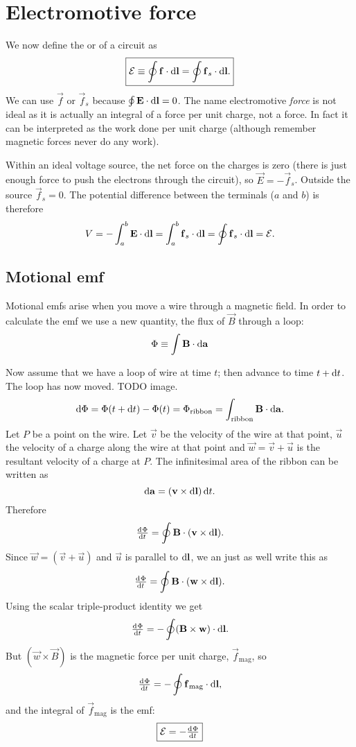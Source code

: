 \section{Electromotive force}
We now define the  or  of a circuit as
\[ \boxed{ \mathcal{E} \equiv \oint \bm{\mathrm{f}}\cdot \operatorname{d \!}{\bm{\mathrm{l}}} = \oint \bm{\mathrm{f}}_s\cdot \operatorname{d \!}{\bm{\mathrm{l}}}.} \]
We can use $\vec{f}$ or $\vec{f}_s$ because $\oint \bm{\mathrm{E}}\cdot \operatorname{d \!}{\bm{\mathrm{l}}} = 0$. The name electromotive \textit{force} is not ideal as it is actually an integral of a force per unit charge, not a force. In fact it can be interpreted as the work done per unit charge (although remember magnetic forces never do any work).

Within an ideal voltage source, the net force on the charges is zero (there is just enough force to push the electrons through the circuit), so $\vec{E} = - \vec{f}_s$. Outside the source $\vec{f}_s = 0$. The potential difference between the terminals ($a$ and $b$) is therefore
\[ V = -\int_a^b \bm{\mathrm{E}}\cdot \operatorname{d \!}{\bm{\mathrm{l}}} = \int^b_a \bm{\mathrm{f}}_s\cdot \operatorname{d \!}{\bm{\mathrm{l}}} = \oint \bm{\mathrm{f}}_s \cdot \operatorname{d \!}{\bm{\mathrm{l}}} = \mathcal{E}. \]

\subsection{Motional emf}
Motional emfs arise when you move a wire through a magnetic field. In order to calculate the emf we use a new quantity, the flux of $\vec{B}$ through a loop:
\[ \Phi \equiv \int \bm{\mathrm{B}}\cdot \operatorname{d \!}{\bm{\mathrm{a}}} \]

Now assume that we have a loop of wire at time $t$; then advance to time $t+\operatorname{d \!}{t}$. The loop has now moved. TODO image.
\[ \operatorname{d \!}{\Phi} = \Phi(t+\operatorname{d \!}{t}) - \Phi(t) = \Phi_\text{ribbon} = \int_\text{ribbon} \bm{\mathrm{B}}\cdot \operatorname{d \!}{\bm{\mathrm{a}}}. \]
Let $P$ be a point on the wire. Let $\vec{v}$ be the velocity of the wire at that point, $\vec{u}$ the velocity of a charge along the wire at that point and $\vec{w} = \vec{v} + \vec{u}$ is the resultant velocity of a charge at $P$. The infinitesimal area of the ribbon can be written as
\[ \operatorname{d \!}{\bm{\mathrm{a}}} = (\bm{\mathrm{v}}\times \operatorname{d \!}{\bm{\mathrm{l}}})\operatorname{d \!}{t}. \]
Therefore
\[ \od{\Phi}{t} = \oint \vec{B}\cdot (\vec{v}\times \diff{\vec{l}}). \]
Since $\vec{w} = (\vec{v} + \vec{u})$ and $\vec{u}$ is parallel to $\operatorname{d \!}{\bm{\mathrm{l}}}$, we an just as well write this as
\[ \od{\Phi}{t} = \oint \vec{B}\cdot (\vec{w}\times \diff{\vec{l}}). \]
Using the scalar triple-product identity we get
\[ \od{\Phi}{t} = - \oint (\vec{B}\times \vec{w})\cdot \diff{\vec{l}}. \]
But $(\vec{w}\times \vec{B})$ is the magnetic force per unit charge, $\vec{f}_\text{mag}$, so
\[ \od{\Phi}{t} = - \oint \vec{f}_\text{mag}\cdot \diff{\vec{l}}, \]
and the integral of $\vec{f}_\text{mag}$ is the emf:
\[ \boxed{\mathcal{E} = - \od{\Phi}{t}} \]

